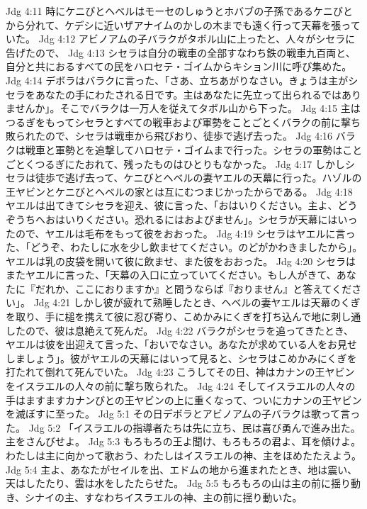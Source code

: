 Jdg 4:11  時にケニびとヘベルはモーセのしゅうとホバブの子孫であるケニびとから分れて、ケデシに近いザアナイムのかしの木までも遠く行って天幕を張っていた。
Jdg 4:12  アビノアムの子バラクがタボル山に上ったと、人々がシセラに告げたので、
Jdg 4:13  シセラは自分の戦車の全部すなわち鉄の戦車九百両と、自分と共におるすべての民をハロセテ・ゴイムからキション川に呼び集めた。
Jdg 4:14  デボラはバラクに言った、「さあ、立ちあがりなさい。きょうは主がシセラをあなたの手にわたされる日です。主はあなたに先立って出られるではありませんか」。そこでバラクは一万人を従えてタボル山から下った。
Jdg 4:15  主はつるぎをもってシセラとすべての戦車および軍勢をことごとくバラクの前に撃ち敗られたので、シセラは戦車から飛びおり、徒歩で逃げ去った。
Jdg 4:16  バラクは戦車と軍勢とを追撃してハロセテ・ゴイムまで行った。シセラの軍勢はことごとくつるぎにたおれて、残ったものはひとりもなかった。
Jdg 4:17  しかしシセラは徒歩で逃げ去って、ケニびとヘベルの妻ヤエルの天幕に行った。ハゾルの王ヤビンとケニびとヘベルの家とは互にむつまじかったからである。
Jdg 4:18  ヤエルは出てきてシセラを迎え、彼に言った、「おはいりください。主よ、どうぞうちへおはいりください。恐れるにはおよびません」。シセラが天幕にはいったので、ヤエルは毛布をもって彼をおおった。
Jdg 4:19  シセラはヤエルに言った、「どうぞ、わたしに水を少し飲ませてください。のどがかわきましたから」。ヤエルは乳の皮袋を開いて彼に飲ませ、また彼をおおった。
Jdg 4:20  シセラはまたヤエルに言った、「天幕の入口に立っていてください。もし人がきて、あなたに『だれか、ここにおりますか』と問うならば『おりません』と答えてください」。
Jdg 4:21  しかし彼が疲れて熟睡したとき、ヘベルの妻ヤエルは天幕のくぎを取り、手に槌を携えて彼に忍び寄り、こめかみにくぎを打ち込んで地に刺し通したので、彼は息絶えて死んだ。
Jdg 4:22  バラクがシセラを追ってきたとき、ヤエルは彼を出迎えて言った、「おいでなさい。あなたが求めている人をお見せしましょう」。彼がヤエルの天幕にはいって見ると、シセラはこめかみにくぎを打たれて倒れて死んでいた。
Jdg 4:23  こうしてその日、神はカナンの王ヤビンをイスラエルの人々の前に撃ち敗られた。
Jdg 4:24  そしてイスラエルの人々の手はますますカナンびとの王ヤビンの上に重くなって、ついにカナンの王ヤビンを滅ぼすに至った。
Jdg 5:1  その日デボラとアビノアムの子バラクは歌って言った。
Jdg 5:2  「イスラエルの指導者たちは先に立ち、民は喜び勇んで進み出た。主をさんびせよ。
Jdg 5:3  もろもろの王よ聞け、もろもろの君よ、耳を傾けよ。わたしは主に向かって歌おう、わたしはイスラエルの神、主をほめたたえよう。
Jdg 5:4  主よ、あなたがセイルを出、エドムの地から進まれたとき、地は震い、天はしたたり、雲は水をしたたらせた。
Jdg 5:5  もろもろの山は主の前に揺り動き、シナイの主、すなわちイスラエルの神、主の前に揺り動いた。
